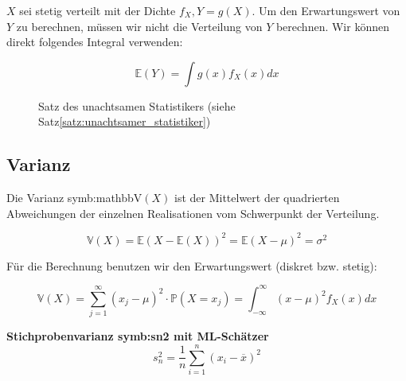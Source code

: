 {\begin{satz}
    $X$ sei stetig verteilt mit der Dichte $f_{X},Y=g\left(X\right)$.
    Um den Erwartungswert von $Y$ zu berechnen, müssen wir nicht die Verteilung von $Y$ berechnen. Wir können
    direkt folgendes Integral verwenden:

    \[\mathbb E\left(Y\right)=\int {g\left(x\right)f_{X}(x)}dx\]

    \end{satz}
    \begin{figure}
    \centering
        \begin{tikzpicture}
            
        \end{tikzpicture}
        \caption{Satz des unachtsamen Statistikers (siehe Satz\ref{satz:unachtsamer_statistiker})}
        \label{fig:unachtsamer_statistiker}
    \end{figure}

    \subsection{Varianz}
    \label{sec:varianz}
    \begin{definition}
    Die Varianz \gls{symb:mathbbV}$(X)$ ist der Mittelwert der quadrierten Abweichungen der
    einzelnen Realisationen vom Schwerpunkt der Verteilung.

    \[\mathbb V\left(X\right)=\mathbb E\left(X-\mathbb E\left(X\right)\right)^{2}=\mathbb E\left(X-\mu\right)^{2}=\sigma ^{2}\]
    \end{definition}

    Für die Berechnung benutzen wir den Erwartungswert (diskret bzw. stetig):

    \[\mathbb V\left(X\right)=\sum_{j=1}^{{\infty}}{\left(x_{j}-\mu\right)^{2}\cdot \mathbb P\left(X=x_{j}\right)}=
    \int_{-{\infty}}^{{\infty}}{\left(x-\mu \right)^{2}f_{X}(x)}dx\]

    \begin{definition}\textbf{Stichprobenvarianz \gls{symb:sn2} mit ML-Schätzer}
        \label{def:stichprobenvarianz}%
        \[s_n^2= \frac{1}{n} \sum_{i=1}^n\left(x_i-\overline x\right)^2\]
    \end{definition}

}
